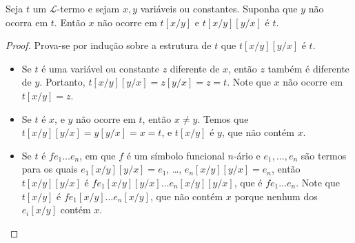 \begin{metalemma}\label{mlem:substituicaoInversaEmTermos}
    Seja $t$ um $\mathcal L$-termo e sejam $x, y$ variáveis ou constantes.
    Suponha que $y$ não ocorra em $t$.
    Então $x$ não ocorre em $t[x/y]$ e $t[x/y][y/x]$ é $t$.
\end{metalemma}
\begin{proof}
    Prova-se por indução sobre a estrutura de $t$ que $t[x/y][y/x]$ é $t$.
    \begin{itemize}
        \item Se $t$ é uma variável ou constante $z$ diferente de $x$, então $z$ também é diferente de $y$.
        Portanto, $t[x/y][y/x]=z[y/x]=z=t$.
        Note que $x$ não ocorre em $t[x/y]=z$.
        \item Se $t$ é $x$, e $y$ não ocorre em $t$, então $x\neq y$.
        Temos que $t[x/y][y/x]=y[y/x]=x=t$, e $t[x/y]$ é $y$, que não contém $x$.
        \item Se $t$ é $fe_1 \dots e_n$, em que $f$ é um símbolo funcional $n$-ário e $e_1, \dots, e_n$ são termos para os quais $e_1[x/y][y/x]=e_1$, \dots, $e_n[x/y][y/x]=e_n$, então $t[x/y][y/x]$ é $fe_1[x/y][y/x] \dots e_n[x/y][y/x]$, que é $fe_1 \dots e_n$.
        Note que $t[x/y]$ é $fe_1[x/y] \dots e_n[x/y]$, que não contém $x$ porque nenhum dos $e_i[x/y]$ contém $x$.
    \end{itemize}
\end{proof}

